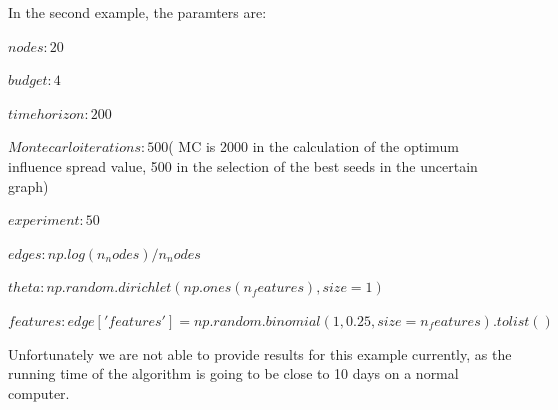 In the second example, the paramters are:

$nodes: 20$

$budget: 4$

$time horizon: 200$

$Montecarlo iterations: 500$( MC is 2000 in the calculation of the optimum influence spread value, 500 in the selection of the best seeds in the uncertain graph)

$experiment: 50$

$edges: np.log(n_nodes) / n_nodes$

$theta: np.random.dirichlet(np.ones(n_features), size=1)$

$features: edge['features'] = np.random.binomial(1, 0.25, size=n_features).tolist()$


Unfortunately we are not able to provide results for this example currently, as the running time of the algorithm is going to be close to 10 days on a normal computer.